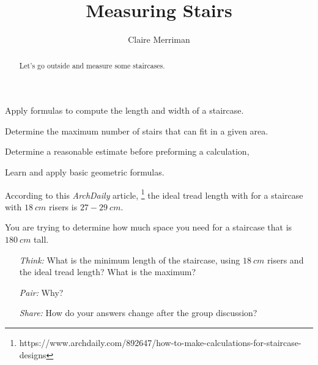 \documentclass[handout,nooutcomes,noauthor,hints]{../ximera}
\title{Measuring Stairs}
\author{Claire Merriman}
\begin{document}
\begin{abstract}
  Let's go outside and measure some staircases.
\end{abstract}
\maketitle


\begin{listOutcomes}
\item Apply formulas to compute the length and width of a staircase.
\item Determine the maximum number of stairs that can fit in a given area.
\end{listOutcomes}

\begin{listObjectives}
\item Determine a reasonable estimate before preforming a calculation,

\item Learn and apply basic geometric formulas.

\end{listObjectives}


\begin{question}
 According to this  \emph{ArchDaily} article, \footnote{https://www.archdaily.com/892647/how-to-make-calculations-for-staircase-designs}  the ideal tread length with for a staircase with $18\ cm$ risers is $27-29\ cm$.
 
 \begin{center}
\end{center}

You are trying to determine how much space you need for a staircase that is $180\ cm$ tall.  

\begin{itemize}
 \item[\emph{Think:}] What is the minimum length of the staircase, using $18\ cm$ risers and the ideal tread length? What is the maximum?
 \item[\emph{Pair:}] Why?
 \item[\emph{Share:}] How do your answers change after the group discussion?
\end{itemize}
\end{question}
\end{document}
